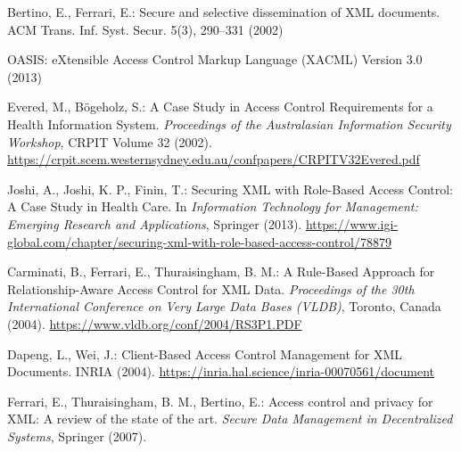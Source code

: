 \documentclass[runningheads]{llncs}
\begin{document}
\begin{spacing}{1.5}
\begin{thebibliography}{9}
    Bertino, E., Ferrari, E.: Secure and selective dissemination of XML documents. ACM Trans. Inf. Syst. Secur. 5(3), 290--331 (2002)
    
    OASIS: eXtensible Access Control Markup Language (XACML) Version 3.0 (2013)
    
    Evered, M., Bögeholz, S.: A Case Study in Access Control Requirements for a Health Information System. \textit{Proceedings of the Australasian Information Security Workshop}, CRPIT Volume 32 (2002). \url{https://crpit.scem.westernsydney.edu.au/confpapers/CRPITV32Evered.pdf}
    
    Joshi, A., Joshi, K. P., Finin, T.: Securing XML with Role-Based Access Control: A Case Study in Health Care. In \textit{Information Technology for Management: Emerging Research and Applications}, Springer (2013). \url{https://www.igi-global.com/chapter/securing-xml-with-role-based-access-control/78879}
    
    Carminati, B., Ferrari, E., Thuraisingham, B. M.: A Rule-Based Approach for Relationship-Aware Access Control for XML Data. \textit{Proceedings of the 30th International Conference on Very Large Data Bases (VLDB)}, Toronto, Canada (2004). \url{https://www.vldb.org/conf/2004/RS3P1.PDF}
    
    Dapeng, L., Wei, J.: Client-Based Access Control Management for XML Documents. INRIA (2004). \url{https://inria.hal.science/inria-00070561/document}
    
    Ferrari, E., Thuraisingham, B. M., Bertino, E.: Access control and privacy for XML: A review of the state of the art. \textit{Secure Data Management in Decentralized Systems}, Springer (2007). 
    
\end{thebibliography}
\end{spacing}
    
\end{document}
